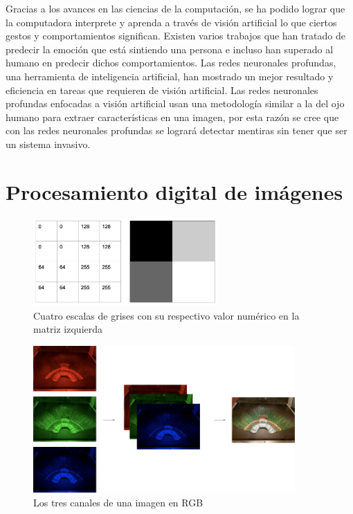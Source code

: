 \begin{onehalfspacing}
Gracias a los avances en las ciencias de la computación, se ha podido lograr que la computadora interprete y aprenda a través de visión artificial lo que ciertos gestos y comportamientos significan. Existen varios trabajos que han tratado de predecir la emoción que está sintiendo una persona e incluso han superado al humano en predecir dichos comportamientos. Las redes neuronales profundas, una herramienta de inteligencia artificial, han mostrado un mejor resultado y eficiencia en tareas que requieren de visión artificial. Las redes neuronales profundas enfocadas a visión artificial usan una metodología similar a la del ojo humano para extraer características en una imagen, por esta razón se cree que con las redes neuronales profundas se logrará detectar mentiras sin tener que ser un sistema invasivo.\\

\section{Procesamiento digital de imágenes}
\label{Procesamiento_digital_de_imagenes}
\begin{figure}[p]
	\centering
	\includegraphics[width=7cm,keepaspectratio]{XX_Figures/Fig_GS.png}
	\caption{\footnotesize Cuatro escalas de grises con su respectivo valor numérico en la matriz izquierda}
	\label{fig:Fig_GS}
\end{figure}

\begin{figure}[p]
	\centering
	\includegraphics[width=10cm,keepaspectratio]{XX_Figures/Fig_RGB.png}
	\caption{\footnotesize Los tres canales de una imagen en RGB }
	\label{fig:Fig_RGB}
\end{figure}



\end{onehalfspacing}
